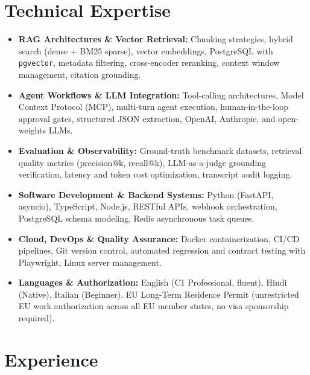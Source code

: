 \documentclass[10pt,a4paper]{article}
\begin{document}
\section{Technical Expertise}
\begin{itemize}
  \item \textbf{RAG Architectures \& Vector Retrieval:} Chunking strategies, hybrid search (dense + BM25 sparse), vector embeddings, PostgreSQL with \texttt{pgvector}, metadata filtering, cross-encoder reranking, context window management, citation grounding.
  \item \textbf{Agent Workflows \& LLM Integration:} Tool-calling architectures, Model Context Protocol (MCP), multi-turn agent execution, human-in-the-loop approval gates, structured JSON extraction, OpenAI, Anthropic, and open-weights LLMs.
  \item \textbf{Evaluation \& Observability:} Ground-truth benchmark datasets, retrieval quality metrics (precision@k, recall@k), LLM-as-a-judge grounding verification, latency and token cost optimization, transcript audit logging.
  \item \textbf{Software Development \& Backend Systems:} Python (FastAPI, asyncio), TypeScript, Node.js, RESTful APIs, webhook orchestration, PostgreSQL schema modeling, Redis asynchronous task queues.
  \item \textbf{Cloud, DevOps \& Quality Assurance:} Docker containerization, CI/CD pipelines, Git version control, automated regression and contract testing with Playwright, Linux server management.
  \item \textbf{Languages \& Authorization:} English (C1 Professional, fluent), Hindi (Native), Italian (Beginner). EU Long-Term Residence Permit (unrestricted EU work authorization across all EU member states, no visa sponsorship required).
\end{itemize}

\section{Experience}
\end{document}
